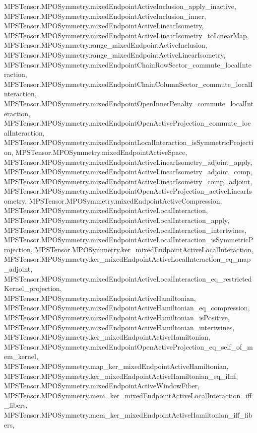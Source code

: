 \begin{lemma}
{        MPSTensor.MPOSymmetry.mixedEndpointActiveInclusion_apply_inactive,
        MPSTensor.MPOSymmetry.mixedEndpointActiveInclusion_inner,
        MPSTensor.MPOSymmetry.mixedEndpointActiveLinearIsometry,
        MPSTensor.MPOSymmetry.mixedEndpointActiveLinearIsometry_toLinearMap,
        MPSTensor.MPOSymmetry.range_mixedEndpointActiveInclusion,
        MPSTensor.MPOSymmetry.range_mixedEndpointActiveLinearIsometry,
        MPSTensor.MPOSymmetry.mixedEndpointChainRowSector_commute_localInteraction,
        MPSTensor.MPOSymmetry.mixedEndpointChainColumnSector_commute_localInteraction,
        MPSTensor.MPOSymmetry.mixedEndpointOpenInnerPenalty_commute_localInteraction,
        MPSTensor.MPOSymmetry.mixedEndpointOpenActiveProjection_commute_localInteraction,
        MPSTensor.MPOSymmetry.mixedEndpointLocalInteraction_isSymmetricProjection,
        MPSTensor.MPOSymmetry.mixedEndpointActiveSpace,
        MPSTensor.MPOSymmetry.mixedEndpointActiveLinearIsometry_adjoint_apply,
        MPSTensor.MPOSymmetry.mixedEndpointActiveLinearIsometry_adjoint_comp,
        MPSTensor.MPOSymmetry.mixedEndpointActiveLinearIsometry_comp_adjoint,
        MPSTensor.MPOSymmetry.mixedEndpointOpenActiveProjection_activeLinearIsometry,
        MPSTensor.MPOSymmetry.mixedEndpointActiveCompression,
        MPSTensor.MPOSymmetry.mixedEndpointActiveLocalInteraction,
        MPSTensor.MPOSymmetry.mixedEndpointActiveLocalInteraction_apply,
        MPSTensor.MPOSymmetry.mixedEndpointActiveLocalInteraction_intertwines,
        MPSTensor.MPOSymmetry.mixedEndpointActiveLocalInteraction_isSymmetricProjection,
        MPSTensor.MPOSymmetry.ker_mixedEndpointActiveLocalInteraction,
        MPSTensor.MPOSymmetry.ker_mixedEndpointActiveLocalInteraction_eq_map_adjoint,
        MPSTensor.MPOSymmetry.mixedEndpointActiveLocalInteraction_eq_restrictedKernel_projection,
        MPSTensor.MPOSymmetry.mixedEndpointActiveHamiltonian,
        MPSTensor.MPOSymmetry.mixedEndpointActiveHamiltonian_eq_compression,
        MPSTensor.MPOSymmetry.mixedEndpointActiveHamiltonian_isPositive,
        MPSTensor.MPOSymmetry.mixedEndpointActiveHamiltonian_intertwines,
        MPSTensor.MPOSymmetry.ker_mixedEndpointActiveHamiltonian,
        MPSTensor.MPOSymmetry.mixedEndpointOpenActiveProjection_eq_self_of_mem_kernel,
        MPSTensor.MPOSymmetry.map_ker_mixedEndpointActiveHamiltonian,
        MPSTensor.MPOSymmetry.ker_mixedEndpointActiveHamiltonian_eq_iInf,
        MPSTensor.MPOSymmetry.mixedEndpointActiveWindowFiber,
        MPSTensor.MPOSymmetry.mem_ker_mixedEndpointActiveLocalInteraction_iff_fibers,
        MPSTensor.MPOSymmetry.mem_ker_mixedEndpointActiveHamiltonian_iff_fibers,
}
\end{lemma}
